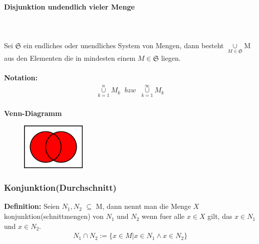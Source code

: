 \documentclass[../AbiMappe_Mathe.tex]{subfiles}
\begin{document}
\paragraph{Disjunktion undendlich vieler Menge}
		\hspace{0 cm} \\ \noindent \\
		Sei $\mathfrak{S}$ ein endliches oder unendliches System von Mengen, dann besteht $\underset{M \in \mathfrak{S}}{\cup}$M aus den Elementen die in mindesten einem $M \in  \mathfrak{S}$ liegen.\\\\
\textbf{Notation:}\\
\begin{align*}
\underset{k=1}{\overset{n}{\cup}}M_k \;\;bzw\;\; \underset{k=1}{\overset{\infty}{\cup}}M_k
\end{align*}\\
\textbf{Venn-Diagramm}
\begin{figure}[H]
\centering
\includegraphics[width=117px, height=85.5px]{VennDis.png}
\end{figure}
\subsubsection{Konjunktion(Durchschnitt)}
\textbf{Definition:} Seien $N_1,N_2$ $\subseteq$ M, dann nennt man die Menge $X$ konjunktion(schnittmengen) von $N_1$ und  $N_2$ wenn fuer alle $x \in X$ gilt, das $x \in N_1$ und $x \in N_2$.
\begin{align*}
N_1 \cap N_2:=\{x \in M| x \in N_1 \land x \in N_2 \}
\end{align*}\\
\end{document}
